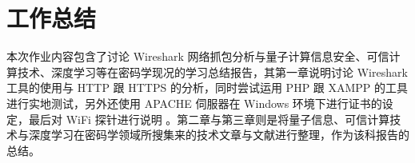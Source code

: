 \chapter{工作总结}
\label{chap:5}

本次作业内容包含了讨论 Wireshark 网络抓包分析与量子计算信息安全、可信计算技术、深度学习等在密码学现况的学习总结报告，其第一章说明讨论 Wireshark 工具的使用与 HTTP 跟 HTTPS 的分析，同时尝试运用 PHP 跟 XAMPP 的工具进行实地测试，另外还使用 APACHE 伺服器在 Windows 环境下进行证书的设定，最后对 WiFi 探针进行说明 。第二章与第三章则是将量子信息、可信计算技术与深度学习在密码学领域所搜集来的技术文章与文献进行整理，作为该科报告的总结。